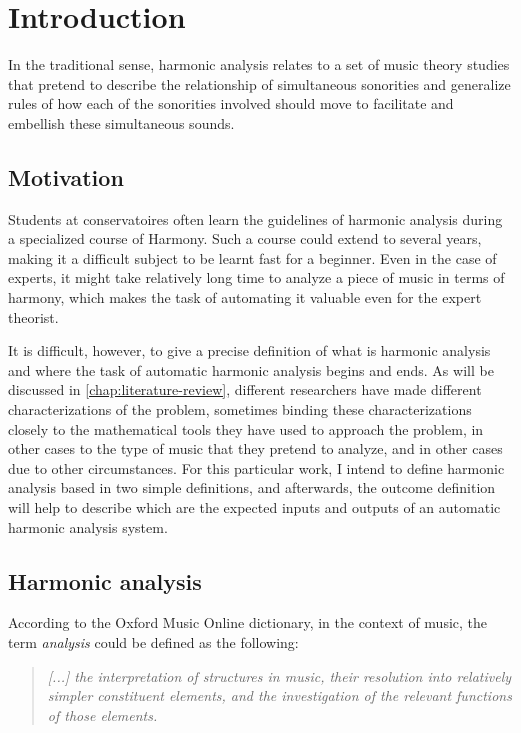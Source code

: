 \chapter{Introduction}
\label{chap:introduction}
In the traditional sense, harmonic analysis relates to a set of music theory studies that pretend to describe the relationship of simultaneous sonorities and generalize rules of how each of the sonorities involved should move to facilitate and embellish these simultaneous sounds.

\section{Motivation}
Students at conservatoires often learn the guidelines of harmonic analysis during a specialized course of Harmony. Such a course could extend to several years, making it a difficult subject to be learnt fast for a beginner. Even in the case of experts, it might take relatively long time to analyze a piece of music in terms of harmony, which makes the task of automating it valuable even for the expert theorist.


It is difficult, however, to give a precise definition of what is harmonic analysis and where the task of automatic harmonic analysis begins and ends. As will be discussed in \autoref{chap:literature-review}, different researchers have made different characterizations of the problem, sometimes binding these characterizations closely to the mathematical tools they have used to approach the problem, in other cases to the type of music that they pretend to analyze, and in other cases due to other circumstances. For this particular work, I intend to define harmonic analysis based in two simple definitions, and afterwards, the outcome definition will help to describe which are the expected inputs and outputs of an automatic harmonic analysis system.

\section{Harmonic analysis}
According to the Oxford Music Online dictionary, in the context of music, the term \emph{analysis} could be defined as the following: \cite{oxfordanalysis}

\begin{quote}
\centering
\emph{[...] the interpretation of structures in music, \linebreak
their resolution into relatively simpler constituent elements, \linebreak and the investigation of the relevant functions of those elements.}
\end{quote}

